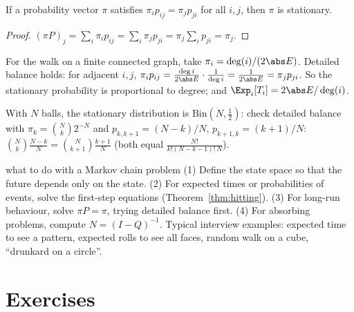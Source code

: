 \begin{theorem}\label{thm:detailed}
If a probability vector $\pi$ satisfies $\pi_ip_{ij}=\pi_jp_{ji}$ for all $i,j$, then $\pi$
is stationary.
\end{theorem}
\begin{proof}
$(\pi P)_j=\sum_i\pi_ip_{ij}=\sum_i\pi_jp_{ji}=\pi_j\sum_ip_{ji}=\pi_j$.
\end{proof}

\begin{example}
For the walk on a finite connected graph, take $\pi_i=\deg(i)/(2\abs E)$. Detailed balance
holds: for adjacent $i,j$, $\pi_ip_{ij}=\frac{\deg i}{2\abs E}\cdot\frac1{\deg i}
=\frac1{2\abs E}=\pi_jp_{ji}$. So the stationary probability is proportional to
degree; and $\Exp_i[T_i]=2\abs E/\deg(i)$.
\end{example}

\begin{example}
With $N$ balls, the stationary distribution is $\mathrm{Bin}(N,\tfrac12)$: check detailed
balance with $\pi_k=\binom Nk2^{-N}$ and $p_{k,k+1}=(N-k)/N$, $p_{k+1,k}=(k+1)/N$:
$\binom Nk\frac{N-k}N=\binom N{k+1}\frac{k+1}N$ (both equal $\frac{N!}{k!(N-k-1)!\,N}$).
\end{example}

\begin{interview}{what to do with a Markov chain problem}
(1) Define the state space so that the future depends only on the state. (2) For
expected times or probabilities of events, solve the first-step equations
(Theorem~\ref{thm:hitting}). (3) For long-run behaviour, solve $\pi P=\pi$, trying
detailed balance first. (4) For absorbing problems, compute $N=(I-Q)^{-1}$.
Typical interview examples: expected time to see a pattern, expected rolls to see all faces,
random walk on a cube, ``drunkard on a circle''.
\end{interview}

\section*{Exercises}

